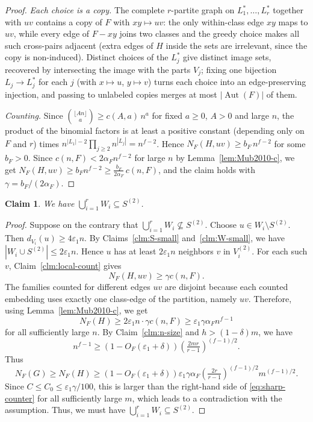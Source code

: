 \documentclass[11pt,a4paper]{article}
\newtheorem{claim}[theorem]{Claim}
\theoremstyle{definition}
\theoremstyle{plain}
\newcommand{\Aut}{\operatorname{Aut}}
\newcommand{\eps}{\varepsilon}
\renewcommand{\le}{\leqslant}
\renewcommand{\ge}{\geqslant}
\begin{document}
\begin{proof}
\emph{Each choice is a copy.} The complete $r$-partite
graph on $L_1^{*},\dots,L_r^{*}$ together with $uv$
contains a copy of $F$ with $xy\mapsto uv$: the only
within-class edge $xy$ maps to $uv$, while every edge of
$F-xy$ joins two classes and the greedy choice makes all
such cross-pairs adjacent (extra edges of $H$ inside the
sets are irrelevant, since the copy is non-induced).
Distinct choices of the $L_j^{*}$ give distinct image
sets, recovered by intersecting the image with the parts
$V_j$; fixing one bijection $L_j\to L_j^{*}$ for each $j$
(with $x\mapsto u$, $y\mapsto v$) turns each choice into an
edge-preserving injection, and passing to unlabeled copies
merges at most $|\Aut(F)|$ of them.

\emph{Counting.} Since
$\binom{\lfloor An\rfloor}{a}\ge c(A,a)\,n^a$ for fixed
$a\ge0$, $A>0$ and large $n$, the product of the binomial
factors is at least a positive constant (depending only on
$F$ and $r$) times
$n^{|L_1|-2}\prod_{j\ge2}n^{|L_j|}=n^{f-2}$. Hence
$N_F(H,uv)\ge b_F\,n^{f-2}$ for some $b_F>0$. Since
$c(n,F)<2\alpha_Fn^{f-2}$ for large $n$ by
Lemma~\ref{lem:Mub2010-c}, we get
$N_F(H,uv)\ge b_F n^{f-2}\ge\tfrac{b_F}{2\alpha_F}\,c(n,F)$,
and the claim holds with $\gamma=b_F/(2\alpha_F)$.
\end{proof} 



\begin{claim} \label{cl-W-sub-S2}
We have $\bigcup_{i=1}^r W_i\subseteq S^{(2)}$. 
\end{claim}

\begin{proof}
Suppose on the contrary that 
$\bigcup_{i=1}^r W_i\not\subseteq S^{(2)}$.  
Choose $u\in W_i\setminus S^{(2)}$.  Then $d_{V_i}(u)\ge4\eps_1n$.  By Claims~\ref{clm:S-small} and~\ref{clm:W-small}, we have 
$
  |W_i\cup S^{(2)}|\le2\eps_1n$.
Hence $u$ has at least $2\eps_1n$ neighbors $v$ in $V_i^{(2)}$.  For each such $v$, Claim~\ref{clm:local-count} gives
$$  N_F(H,uv)\ge \gamma c(n,F).$$ 
The families counted for different edges $uv$ are disjoint because each counted embedding uses exactly one class-edge of the partition, namely $uv$.  Therefore, using Lemma~\ref{lem:Mub2010-c}, we get 
\[
   N_F (H)
  \ge 2\eps_1n \cdot \gamma c(n,F)
  \ge \eps_1\gamma\alpha_F n^{f-1}
\]
for all sufficiently large $n$.  By Claim~\ref{clm:n-size} and $h>(1-\delta)m$, 
we have 
\[
  n^{f-1}
  \ge
  (1-O_F(\eps_1+\delta))
  \left(\tfrac{2mr}{r-1}\right)^{(f-1)/2}.
\]
Thus
\[
   N_F (G)\ge N_F (H)
  \ge
  (1-O_F(\eps_1+\delta))\eps_1\gamma\alpha_F
  \left(\tfrac{2r}{r-1}\right)^{(f-1)/2}m^{(f-1)/2}.
\]
Since $C\le C_0\le\eps_1\gamma/100$, this is larger than the right-hand side of \eqref{eq:sharp-counter} for all sufficiently large $m$, which leads to a contradiction with the assumption. Thus, we must have 
$\bigcup_{i=1}^r W_i\subseteq S^{(2)}$. 
\end{proof}
\end{document}
